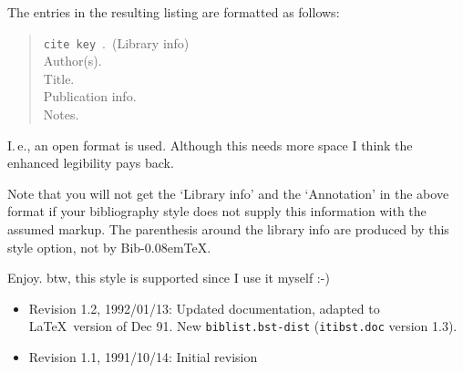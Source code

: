 \documentclass[DIV=9, pagesize=auto]{scrartcl}
\makeatletter
\newcommand*{\BibTeX}{Bib\kern-0.08em\TeX\@\xspace}
\makeatother
\begin{document}
\medskip

The entries in the resulting listing are formatted as follows:
%
\begin{quote}
  \texttt{cite key}~\leaders\hbox{.}\hfill~\textsf{(Library info)}\\
  \null\quad Author(s).\\
  Title.\\
  Publication info.\\
  Notes.\\
  \null{}
\end{quote}
%
I.\,e., an open format is used. Although this needs more space I think
the enhanced legibility pays back.

Note that you will not get the `Library info' and the `Annotation' in
the above format if your bibliography style does not supply this
information with the assumed markup. The parenthesis around the library
info are produced by this style option, not by \BibTeX.

Enjoy. btw, this style is supported since I use it myself :-)


%
\begin{itemize}
\item Revision 1.2, 1992/01/13:
  Updated documentation, adapted to \LaTeX\ version of Dec 91.
  New \texttt{biblist.bst-dist} (\texttt{itibst.doc} version 1.3).
\item Revision 1.1, 1991/10/14:
  Initial revision
\end{itemize}
\end{document}
